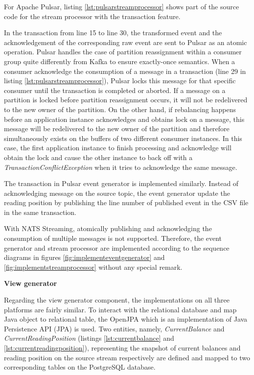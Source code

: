 For Apache Pulsar, listing \ref{lst:pulsarstreamprocessor} shows part of the source code for the stream processor with the transaction feature. 

 

In the transaction from line 15 to line 30, the transformed event and the acknowledgement of the corresponding raw event are sent to Pulsar as an atomic operation. Pulsar handles the case of partition reassignment within a consumer group quite differently from Kafka to ensure exactly-once semantics. When a consumer acknowledge the consumption of a message in a transaction (line 29 in listing \ref{lst:pulsarstreamprocessor}), Pulsar locks this message for that specific consumer \cite{pulsartransaction} until the transaction is completed or aborted. If a message on a partition is locked before partition reassignment occurs, it will not be redelivered to the new owner of the partition. On the other hand, if rebalancing happens before an application instance acknowledges and obtains lock on a message, this message will be redelivered to the new owner of the partition and therefore simultaneously exists on the buffers of two different consumer instances. In this case, the first application instance to finish processing and acknowledge will obtain the lock and cause the other instance to back off with a \emph{TransactionConflictException} when it tries to acknowledge the same message.

The transaction in Pulsar event generator is implemented similarly. Instead of acknowledging message on the source topic, the event generator update the reading position by publishing the line number of published event in the CSV file in the same transaction. 

With NATS Streaming, atomically publishing and acknowledging the consumption of multiple messages is not supported. Therefore, the event generator and stream processor are implemented according to the sequence diagrams in figures \ref{fig:implementeventgenerator} and \ref{fig:implementstreamprocessor} without any special remark.

\textbf{View generator}

Regarding the view generator component, the implementations on all three platforms are fairly similar. To interact with the relational database and map Java object to relational table, the OpenJPA which is an implementation of Java Persistence API (JPA) \cite{jpa} is used. Two entities, namely, \emph{CurrentBalance} and \emph{CurrentReadingPosition} (listings \ref{lst:currentbalance} and \ref{lst:currentreadingposition}), representing the snapshot of current balances and reading position on the source stream respectively are defined and mapped to two corresponding tables on the PostgreSQL database.   
\newpage

